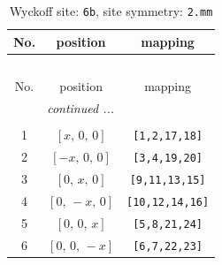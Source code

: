 \documentclass[fleqn,8pt]{jsarticle}
\begin{document}
\renewcommand{\arraystretch}{1.2}
\begin{longtable}{ccc}
\caption{Wyckoff site: {\tt 6b}, site symmetry: {\tt 2.mm}}
 \\
 \hline \hline
No. & position & mapping \\ \hline \endfirsthead

\multicolumn{2}{l}{\tablename\ \thetable{}} \\
 \hline \hline
No. & position & mapping \\ \hline \endhead

 \hline \hline
\multicolumn{2}{r}{\footnotesize\it continued ...} \\ \endfoot

 \hline \hline
\multicolumn{2}{r}{} \\ \endlastfoot

1 & $\left[ x,\, 0,\, 0 \right]$ & {\tt [1,2,17,18]} \\ \hline
2 & $\left[ - x,\, 0,\, 0 \right]$ & {\tt [3,4,19,20]} \\ \hline
3 & $\left[ 0,\, x,\, 0 \right]$ & {\tt [9,11,13,15]} \\ \hline
4 & $\left[ 0,\, - x,\, 0 \right]$ & {\tt [10,12,14,16]} \\ \hline
5 & $\left[ 0,\, 0,\, x \right]$ & {\tt [5,8,21,24]} \\ \hline
6 & $\left[ 0,\, 0,\, - x \right]$ & {\tt [6,7,22,23]} \\
\end{longtable}
\renewcommand{\arraystretch}{1.2}
\end{document}
